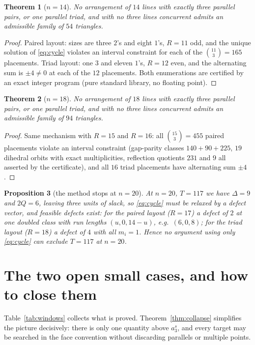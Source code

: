 \documentclass[11pt]{article}
\newtheorem{theorem}{Theorem}
\newtheorem{proposition}[theorem]{Proposition}
\theoremstyle{definition}
\begin{document}
\begin{theorem}[$n=14$]\label{thm:M}
No arrangement of $14$ lines with exactly three parallel pairs, or one
parallel triad, and with no three lines concurrent admits an admissible
family of $54$ triangles.
\end{theorem}

\begin{proof}
Paired layout: sizes are three $2$'s and eight $1$'s, $R=11$ odd, and the
unique solution of \eqref{eq:cycle} violates an interval constraint for each
of the $\binom{11}{3}=165$ placements. Triad layout: one $3$ and eleven
$1$'s, $R=12$ even, and the alternating sum is $\pm4\ne0$ at each of the $12$
placements. Both enumerations are certified by an exact integer program
(pure standard library, no floating point).
\end{proof}

\begin{theorem}[$n=18$]\label{thm:M18}
No arrangement of $18$ lines with exactly three parallel pairs, or one
parallel triad, and with no three lines concurrent admits an admissible
family of $94$ triangles.
\end{theorem}

\begin{proof}
Same mechanism with $R=15$ and $R=16$: all $\binom{15}{3}=455$ paired
placements violate an interval constraint (gap-parity classes $140+90+225$,
$19$ dihedral orbits with exact multiplicities, reflection quotients $231$
and $9$ all asserted by the certificate), and all $16$ triad placements have
alternating sum $\pm4$.
\end{proof}
\begin{proposition}[the method stops at $n=20$]\label{prop:n20}
At $n=20$, $T=117$ we have $\Delta=9$ and $2Q=6$, leaving three units of
slack, so \eqref{eq:cycle} must be relaxed by a defect vector, and feasible
defects exist: for the paired layout ($R=17$) a defect of $2$ at one doubled
class with run lengths $(u,0,14-u)$, e.g.\ $(6,0,8)$; for the triad layout
($R=18$) a defect of $4$ with all $m_i=1$. Hence no argument using only
\eqref{eq:cycle} can exclude $T=117$ at $n=20$.
\end{proposition}

\section{The two open small cases, and how to close them}

Table~\ref{tab:windows} collects what is proved. Theorem~\ref{thm:collapse}
simplifies the picture decisively: there is only one quantity above
$a_3^s$, and every target may be searched in the face convention without
discarding parallels or multiple points.
\end{document}
